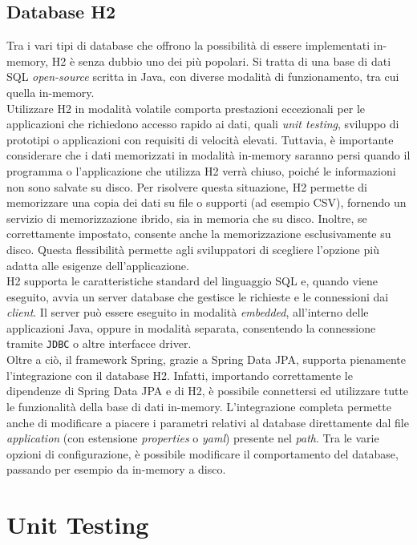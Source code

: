 \subsection{Database H2}

Tra i vari tipi di database che offrono la possibilità di essere implementati in-memory, H2 è senza dubbio uno dei più popolari. Si tratta di una base di dati SQL \textit{open-source} scritta in Java, con diverse modalità di funzionamento, tra cui quella in-memory.\\
Utilizzare H2 in modalità volatile comporta prestazioni eccezionali per le applicazioni che richiedono accesso rapido ai dati, quali \textit{unit testing}, sviluppo di prototipi o applicazioni con requisiti di velocità elevati. Tuttavia, è importante considerare che i dati memorizzati in modalità in-memory saranno persi quando il programma o l’applicazione che utilizza H2 verrà chiuso, poiché le informazioni non sono salvate su disco. Per risolvere questa situazione, H2 permette di memorizzare una copia dei dati su file o supporti (ad esempio CSV), fornendo un servizio di memorizzazione ibrido, sia in memoria che su disco. Inoltre, se correttamente impostato, consente anche la memorizzazione esclusivamente su disco. Questa flessibilità permette agli sviluppatori di scegliere l’opzione più adatta alle esigenze dell'applicazione.\\
H2 supporta le caratteristiche standard del linguaggio SQL e, quando viene eseguito, avvia un server database che gestisce le richieste e le connessioni dai \textit{client}. Il server può essere eseguito in modalità \textit{embedded}, all’interno delle applicazioni Java, oppure in modalità separata, consentendo la connessione tramite \texttt{JDBC} o altre interfacce driver.\cite{H2_h2database}\\
Oltre a ciò, il framework Spring, grazie a Spring Data JPA, supporta pienamente l’integrazione con il database H2. Infatti, importando correttamente le dipendenze di Spring Data JPA e di H2, è possibile connettersi ed utilizzare tutte le funzionalità della base di dati in-memory. L’integrazione completa permette anche di modificare a piacere i parametri relativi al database direttamente dal file \textit{application} (con estensione \textit{properties} o \textit{yaml}) presente nel \textit{path}. Tra le varie opzioni di configurazione, è possibile modificare il comportamento del database, passando per esempio da in-memory a disco.\cite{H2_baeldung}

\section{Unit Testing}


